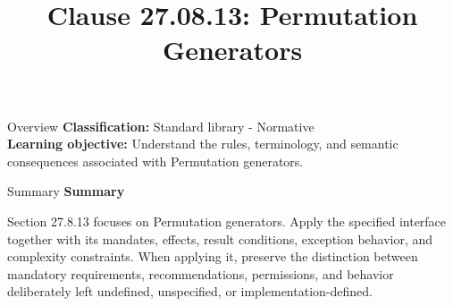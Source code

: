 \documentclass[10pt,letterpaper]{article}
\title{Clause 27.08.13: Permutation Generators}
\author{}
\date{}
\begin{document}
\maketitle
\begin{CornellOverviewBox}{Overview}
\textbf{Classification:} Standard library - Normative\\[2pt]
\textbf{Learning objective:} Understand the rules, terminology, and semantic consequences associated with Permutation generators.
\end{CornellOverviewBox}\begin{CornellSummaryBox}{Summary}
{\sffamily\bfseries\color{Accent} Summary}\par\vspace{3pt}Section 27.8.13 focuses on Permutation generators. Apply the specified interface together with its mandates, effects, result conditions, exception behavior, and complexity constraints. When applying it, preserve the distinction between mandatory requirements, recommendations, permissions, and behavior deliberately left undefined, unspecified, or implementation-defined.
\end{CornellSummaryBox}
\end{document}
